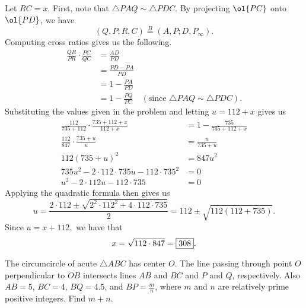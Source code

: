 \documentclass[letterpaper,oneside]{scrartcl}
\begin{document}
\begin{soln}
  Let \(RC = x\). First, note that \(\triangle PAQ \sim \triangle PDC\). By projecting \(\ol{PC}\) onto \(\ol{PD}\), we have
  \[(Q,P;R,C)\overset{B}{=}(A,P;D,P_\infty).\]
  Computing cross ratios gives us the following.
  \begin{align*}
    \frac{QR}{PR}\cdot\frac{PC}{QC} &= \frac{AD}{PD} \\
    &= \frac{PD-PA}{PD} \\
    &= 1 - \frac{PA}{PD} \\
    &= 1- \frac{PQ}{PC} \quad (\text{since } \triangle PAQ \sim \triangle PDC).
  \end{align*}
  Substituting the values given in the problem and letting \(u = 112+x\) gives us
  \begin{align*}
    \frac{112}{735+112}\cdot\frac{735+112+x}{112+x} &= 1 - \frac{735}{735+112+x} \\
    \frac{112}{847}\cdot\frac{735+u}{u} &= \frac{u}{735+u} \\
    112(735+u)^2 &= 847u^2 \\
    735u^2-2\cdot112\cdot735u - 112\cdot735^2 &= 0 \\
    u^2-2\cdot112u - 112\cdot735 &= 0
  \end{align*}
  Applying the quadratic formula then gives us
  \[u = \frac{2\cdot112\pm \sqrt{2^2\cdot112^2 + 4\cdot 112\cdot735}}{2} = 112 \pm \sqrt{112(112+735)}.\]
  Since \(u = x+112,\) we have that
  \[x = \sqrt{112\cdot847} = \fbox{308}.\]
\end{soln}
\begin{problem*}
  [2015 AIME II \#11]
  The circumcircle of acute $\triangle ABC$ has center $O$. The line passing through point $O$ perpendicular to $\overline{OB}$ intersects lines $AB$ and $BC$ and $P$ and $Q$, respectively. Also $AB=5$, $BC=4$, $BQ=4.5$, and $BP=\frac{m}{n}$, where $m$ and $n$ are relatively prime positive integers. Find $m+n$.
\end{problem*}
\end{document}
